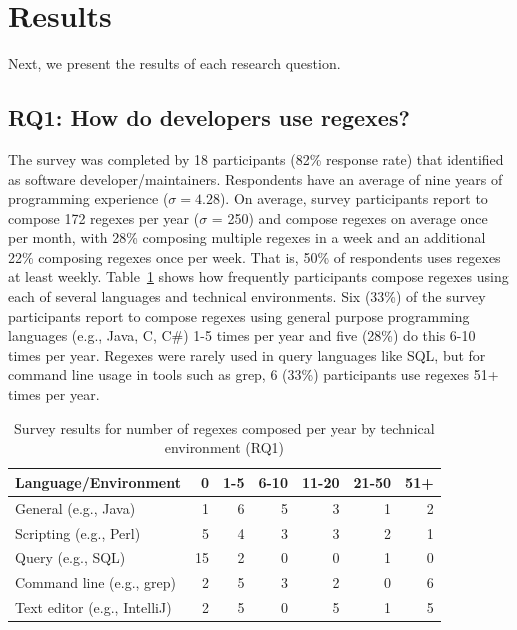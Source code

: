 \section{Results}
\label{sec:results}



Next, we present the results of each research question.

\subsection{RQ1: How do developers use regexes?}
\label{rq1:survey}
The survey was completed by 18 participants (82\% response rate) that identified as software developer/maintainers. 
Respondents have an average of nine years of programming experience ($\sigma = 4.28$).
On average, survey participants report to compose 172 regexes per year ($\sigma$ = 250) and compose regexes on average once per month, with 28\% composing multiple regexes in a week and an additional 22\% composing regexes once per week. That is, 50\% of respondents uses regexes at least weekly.
Table~\ref{tab:regexenviron} shows how frequently participants compose regexes using each of several languages and technical environments.
Six (33\%) of the survey participants report to compose regexes using general purpose programming languages (e.g., Java, C, C\#) 1-5 times per year and five (28\%) do this 6-10 times per year.  Regexes were rarely used in query languages like SQL, but for command line usage in tools such as grep, 6 (33\%) participants use regexes 51+ times per year.

\newcommand{\horiz}{\hspace{2.1pt}}

\begin{table}[t]
\caption{Survey results for number of regexes composed per year by technical environment (RQ1) \label{tab:regexenviron}}
\begin{center}
\begin{small}
\begin{tabular}{l | r @{  \horiz} r @{ \horiz } r @{ \horiz } r @{ \horiz } r @{ \horiz } r }
\toprule
\textbf{Language/Environment} & 0 & 1-5 & 6-10 & 11-20 & 21-50 & 51+ \\  \hline \bigstrut
General  (e.g., Java)  & 1 & 6 & 5 & 3& 1& 2 \\ \hline \bigstrut
Scripting  (e.g., Perl) &5 &4 &3 &3 &2  &1 \\ \hline \bigstrut
Query  (e.g., SQL) & 15&2 &0 &0 &1  & 0\\ \hline \bigstrut
Command line (e.g., grep)   &2 &5 &3 &2 &0  &6 \\ \hline \bigstrut
Text editor (e.g., IntelliJ)   & 2& 5& 0& 5& 1& 5\\
\bottomrule
\end{tabular}
\end{small}
\end{center}
\vspace{-12pt}
\end{table}

